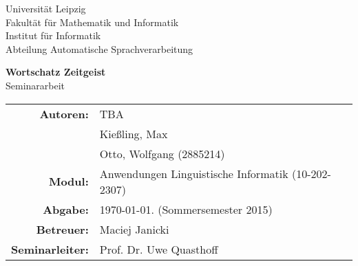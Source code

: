 \documentclass[fontsize=12pt, paper=a4, headinclude, twoside=false, parskip=half+, pagesize=auto, numbers=noenddot, open=right, toc=listof, toc=bibliography]{scrreprt}
\begin{document}

\begin{center}
{\large Universität Leipzig}\\
{\large Fakultät für Mathematik und Informatik}\\
{\large Institut für Informatik}\\
{\large Abteilung Automatische Sprachverarbeitung}\\
\vspace{5mm}
\begin{Large}
\textbf{Wortschatz Zeitgeist}\\
\vspace{5mm}
Seminararbeit\\
\vspace{5mm}
\end{Large}
\vspace{5mm}
\begin{tabular}{ r l }
{\bf Autoren:} 	& TBA\\
			& Kießling, Max\\
			& Otto, Wolfgang (2885214)\\
{\bf Modul:} & Anwendungen Linguistische Informatik (10-202-2307)\\
{\bf Abgabe:} & {\today}. (Sommersemester 2015)\\
{\bf Betreuer:} & Maciej Janicki\\
{\bf Seminarleiter:}&Prof. Dr. Uwe Quasthoff\\ 
\end{tabular}\\
\end{center}
\clearpage

\tableofcontents
\end{document}
